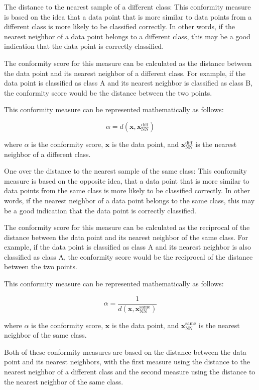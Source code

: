 The distance to the nearest sample of a different class: This conformity measure is based on the idea that a data point that is more similar to data points from a different class is more likely to be classified correctly. In other words, if the nearest neighbor of a data point belongs to a different class, this may be a good indication that the data point is correctly classified.

The conformity score for this measure can be calculated as the distance between the data point and its nearest neighbor of a different class. For example, if the data point is classified as class A and its nearest neighbor is classified as class B, the conformity score would be the distance between the two points.

This conformity measure can be represented mathematically as follows:

$$ \alpha = d(\mathbf{x}, \mathbf{x}_\text{NN}^\text{diff}) $$

where $\alpha$ is the conformity score, $\mathbf{x}$ is the data point, and $\mathbf{x}_\text{NN}^\text{diff}$ is the nearest neighbor of a different class.

One over the distance to the nearest sample of the same class: This conformity measure is based on the opposite idea, that a data point that is more similar to data points from the same class is more likely to be classified correctly. In other words, if the nearest neighbor of a data point belongs to the same class, this may be a good indication that the data point is correctly classified.

The conformity score for this measure can be calculated as the reciprocal of the distance between the data point and its nearest neighbor of the same class. For example, if the data point is classified as class A and its nearest neighbor is also classified as class A, the conformity score would be the reciprocal of the distance between the two points.

This conformity measure can be represented mathematically as follows:

$$ \alpha = \frac{1}{d(\mathbf{x}, \mathbf{x}_\text{NN}^\text{same})} $$

where $\alpha$ is the conformity score, $\mathbf{x}$ is the data point, and $\mathbf{x}_\text{NN}^\text{same}$ is the nearest neighbor of the same class.

Both of these conformity measures are based on the distance between the data point and its nearest neighbors, with the first measure using the distance to the nearest neighbor of a different class and the second measure using the distance to the nearest neighbor of the same class.

